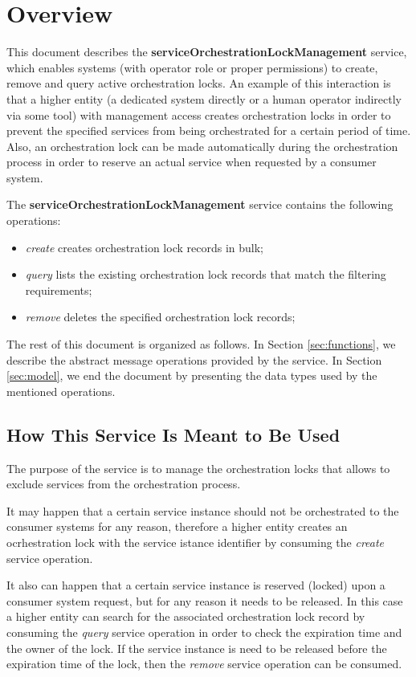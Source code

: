 \documentclass[a4paper]{arrowhead}
\begin{document}
\section{Overview}
\label{sec:overview}
This document describes the \textbf{serviceOrchestrationLockManagement} service, which enables systems (with operator role or proper permissions) to create, remove and query active orchestration locks. An example of this interaction is that a higher entity (a dedicated system directly or a human operator indirectly via some tool) with management access creates orchestration locks in order to prevent the specified services from being orchestrated for a certain period of time. Also, an orchestration lock can be made automatically during the orchestration process in order to reserve an actual service when requested by a consumer system.

The \textbf{serviceOrchestrationLockManagement} service contains the following operations:

\begin{itemize}
    \item \textit{create} creates orchestration lock records in bulk;
    \item \textit{query} lists the existing orchestration lock records that match the filtering requirements;
    \item \textit{remove} deletes the specified orchestration lock records;
\end{itemize}

The rest of this document is organized as follows.
In Section \ref{sec:functions}, we describe the abstract message operations provided by the service.
In Section \ref{sec:model}, we end the document by presenting the data types used by the mentioned operations.

\subsection{How This Service Is Meant to Be Used}

The purpose of the service is to manage the orchestration locks that allows to exclude services from the orchestration process.

It may happen that a certain service instance should not be orchestrated to the consumer systems for any reason, therefore a higher entity creates an ocrhestration lock with the service istance identifier by consuming the \textit{create} service operation.

It also can happen that a certain service instance is reserved (locked) upon a consumer system request, but for any reason it needs to be released. In this case a higher entity can search for the associated orchestration lock record by consuming the \textit{query} service operation in order to check the expiration time and the owner of the lock. If the service instance is need to be released before the expiration time of the lock, then the \textit{remove} service operation can be consumed.
\end{document}
